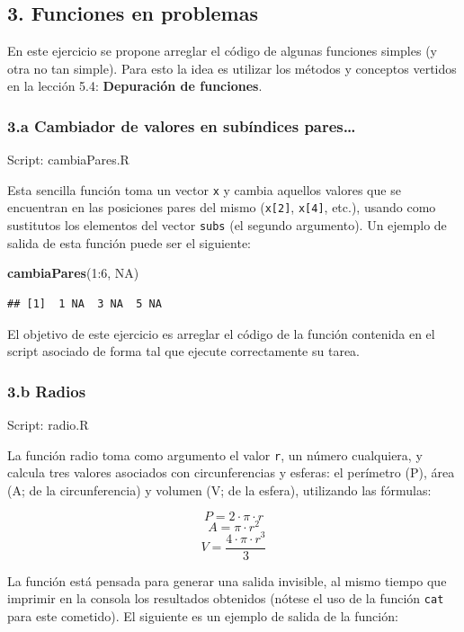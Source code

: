 \documentclass[]{article}
\newenvironment{Shaded}{}{}
\newcommand{\KeywordTok}[1]{\textcolor[rgb]{0.00,0.44,0.13}{\textbf{{#1}}}}
\newcommand{\DecValTok}[1]{\textcolor[rgb]{0.25,0.63,0.44}{{#1}}}
\newcommand{\OtherTok}[1]{\textcolor[rgb]{0.00,0.44,0.13}{{#1}}}
\newcommand{\NormalTok}[1]{{#1}}
\begin{document}
\subsection{3. Funciones en problemas}

En este ejercicio se propone arreglar el código de algunas funciones
simples (y otra no tan simple). Para esto la idea es utilizar los
métodos y conceptos vertidos en la lección 5.4: \textbf{Depuración de
funciones}.

\subsubsection{3.a Cambiador de valores en subíndices pares\ldots{}}

Script: cambiaPares.R

Esta sencilla función toma un vector \texttt{x} y cambia aquellos
valores que se encuentran en las posiciones pares del mismo
(\texttt{x{[}2{]}}, \texttt{x{[}4{]}}, etc.), usando como sustitutos los
elementos del vector \texttt{subs} (el segundo argumento). Un ejemplo de
salida de esta función puede ser el siguiente:

\begin{Shaded}
\begin{Highlighting}[]
\KeywordTok{cambiaPares}\NormalTok{(}\DecValTok{1}\NormalTok{:}\DecValTok{6}\NormalTok{, }\OtherTok{NA}\NormalTok{)}
\end{Highlighting}
\end{Shaded}
\begin{verbatim}
## [1]  1 NA  3 NA  5 NA
\end{verbatim}
El objetivo de este ejercicio es arreglar el código de la función
contenida en el script asociado de forma tal que ejecute correctamente
su tarea.

\subsubsection{3.b Radios}

Script: radio.R

La función radio toma como argumento el valor \texttt{r}, un número
cualquiera, y calcula tres valores asociados con circunferencias y
esferas: el perímetro (P), área (A; de la circunferencia) y volumen (V;
de la esfera), utilizando las fórmulas:

\[
P = 2 \cdot \pi \cdot r
\] \[
A = \pi \cdot r^2
\] \[
V = \frac{4 \cdot \pi \cdot r^3}{3}
\]

La función está pensada para generar una salida invisible, al mismo
tiempo que imprimir en la consola los resultados obtenidos (nótese el
uso de la función \texttt{cat} para este cometido). El siguiente es un
ejemplo de salida de la función:
\end{document}
